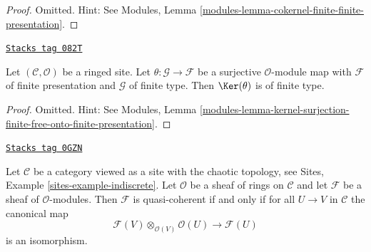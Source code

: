 \begin{proof}
Omitted. Hint: See Modules, Lemma
\ref{modules-lemma-cokernel-finite-finite-presentation}.
\end{proof}

\begin{lemma}
\label{sites-modules-lemma-kernel-surjection-finite-onto-finite-presentation}
\href{https://stacks.math.columbia.edu/tag/082T}{\texttt{Stacks tag 082T}}

Let $(\mathcal{C}, \mathcal{O})$ be a ringed site.
Let $\theta : \mathcal{G} \to \mathcal{F}$ be a surjective
$\mathcal{O}$-module map with $\mathcal{F}$ of finite presentation
and $\mathcal{G}$ of finite type. Then $\Ker(\theta)$ is of finite type.
\end{lemma}

\begin{proof}
Omitted. Hint: See Modules, Lemma
\ref{modules-lemma-kernel-surjection-finite-free-onto-finite-presentation}.
\end{proof}

\begin{lemma}
\label{sites-modules-lemma-chaotic-quasi-coherent}
\href{https://stacks.math.columbia.edu/tag/0GZN}{\texttt{Stacks tag 0GZN}}

Let $\mathcal{C}$ be a category viewed as a site with the chaotic
topology, see Sites, Example \ref{sites-example-indiscrete}. Let $\mathcal{O}$
be a sheaf of rings on $\mathcal{C}$ and let $\mathcal{F}$ be a sheaf
of $\mathcal{O}$-modules. Then $\mathcal{F}$ is quasi-coherent if
and only if for all $U \to V$ in $\mathcal{C}$ the canonical map
$$
\mathcal{F}(V) \otimes_{\mathcal{O}(V)} \mathcal{O}(U)
\longrightarrow
\mathcal{F}(U)
$$
is an isomorphism.
\end{lemma}

